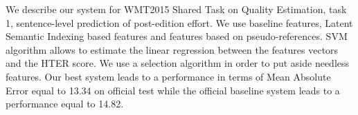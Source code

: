 We describe our system for WMT2015 Shared Task on Quality Estimation, task 1, sentence-level prediction of post-edition effort. We use baseline features, Latent Semantic Indexing based features and features based on pseudo-references. SVM algorithm allows to estimate the linear regression between the features vectors and the HTER score. We use a selection algorithm in order to put aside needless features. Our best system leads to a performance in terms of Mean Absolute Error equal to 13.34 on official test while the official baseline system leads to a performance equal to 14.82.
